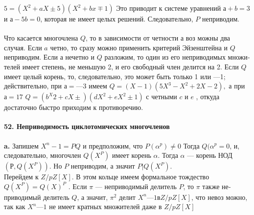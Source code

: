\documentclass{mai_book}
\begin{document}
$5 = (X^{2} + aX \pm 5)(X^{2} + bx \mp 1)$ Это приводит к системе уравнений \linebreak
$а + b = 3$ и $а - 5b = 0$, которая не имеет целых решений. Следовательно,\linebreak
$P$ неприводим.\\
\\
\hspace*{15pt} Что касается многочлена $Q$, то в зависимости от четности а воз­
можны два случая. Если $a$ четно, то сразу можно применить критерий
Эйзенштейна и $Q$ неприводим.
\hspace*{0pt} Если а нечетно и $Q$ разложим, то один из его неприводимых множи­\linebreak
телей имеет степень, не меньшую 2, и его свободный член делится на 2.\linebreak
Если $Q$ имеет целый корень, то, следовательно, это может быть только 1\linebreak
или —1; действительно, при $а = —3$ имеем $Q = (X - 1)(5X^3 - X^2 + 2X - 2),$\linebreak
а при $а = 17$ $Q = (b^X{2} + cX \pm)(dX^{2} + eX^{2} \pm 1)$ с четными $c$ и $e$ , откуда\linebreak
достаточно быстро приходим к противоречию.\\
\\
\noindent\textbf{52. Неприводимость циклотомических многочленов}\\
\\
\hspace*{15pt}\textbf{a.} Запишем $X^{n} - 1 = PQ $ и предположим, что $P(\alpha^p) \neq 0$ Тогда\linebreak
$Q(\alpha^{p} = 0$, и, следовательно, многочлен $Q(X^{P})$ имеет корень $\alpha$. Тогда\linebreak
$\alpha$ ---  корень НОД$(Р, Q(X^{P}))$. Но $P$ неприводим, а значит $P | Q(X^{P})$.\\
\hspace*{0pt}Перейдем к $Z/pZ[X]$. В этом кольце имеем формальное тождество\linebreak
$Q(X^{P}) = Q(X)^{P}$ . Если $\pi$ --- неприводимый делитель $P$, то $\pi$ также не­\linebreak
приводимый делитель $Q$, а значит, $\pi^{2}$ делит $X^{n} — 1 в Z/pZ[X]$, что невоз­\linebreak
можно, так как $X^{n} — 1$ не имеет кратных множителей даже в $Z/pZ[X]$\\
\newpage
\end{document}

